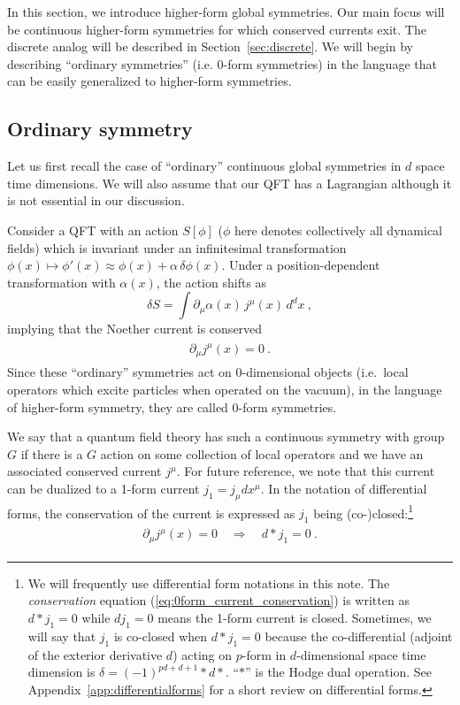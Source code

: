 \documentclass[11pt]{article}
\newcommand{\eq}[1]{\begin{align}\begin{split}#1\end{split}\end{align}}
\def\beq{\begin{equation}}
\def\eeq{\end{equation}}
\begin{document}
In this section, we introduce higher-form global symmetries. 
Our main focus will be continuous higher-form symmetries for which conserved currents exit.
The discrete analog will be described in Section~\ref{sec:discrete}. 
We will begin by describing ``ordinary symmetries'' (i.e. 0-form symmetries) in the language that can be easily generalized to higher-form symmetries.

\subsection{Ordinary symmetry}
\label{subsed:0-form}

Let us first recall the case of ``ordinary'' continuous global symmetries  in $d$ space time dimensions. We will also assume that our QFT has a Lagrangian although it is not essential in our discussion. 

Consider a QFT with an action $S [\phi]$ ($\phi$ here denotes collectively all  dynamical fields) which is invariant under an infinitesimal transformation $\phi (x) \mapsto \phi' (x) \approx \phi (x) + \alpha\, \delta \phi (x)$. Under a position-dependent transformation with $\alpha (x)$, the action shifts as
%
\beq
\delta S = \int \partial_\mu \alpha(x)\, j^\mu (x)\,d^dx~,
\eeq
%
implying that the Noether current is conserved
\eq{\label{eq:0form_current_conservation}
\partial_\mu j^\mu(x)=0~.
}
%
Since these ``ordinary'' symmetries act on 0-dimensional objects (i.e.~local operators which excite particles when operated on the vacuum), in the language of higher-form symmetry, they are called 0-form symmetries.

We say that a quantum field theory has such a continuous symmetry with group $G$ if there is a $G$ action on some collection of local operators and we have an associated conserved current $j^\mu$. For future reference, we note that this current can be dualized to a 1-form current $j_1 = j_\mu dx^\mu$. In the notation of differential forms, the conservation of the current is expressed as $j_1$ being  (co-)closed:\footnote{We will frequently use differential form notations in this note. The \emph{conservation} equation (\ref{eq:0form_current_conservation}) is written as $d \ast  j _1= 0$ while $d j_1 = 0$ means the 1-form current is closed. Sometimes, we will say that $j_1$ is co-closed when $d \ast  j _1= 0$ because the co-differential (adjoint of the exterior derivative $d$) acting on $p$-form in $d$-dimensional space time dimension is $\delta =(-1)^{pd+d+1}\ast d\ast $. ``$\ast $'' is the Hodge dual operation. See Appendix~\ref{app:differentialforms} for a short review on differential forms. }
\eq{
\partial_\mu j^\mu(x)=0\quad\Longrightarrow \quad d\ast j_1=0~. 
}
\end{document}
